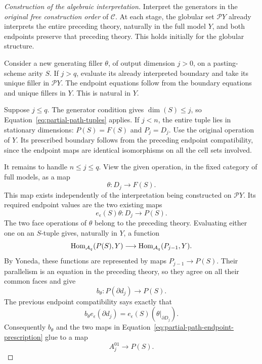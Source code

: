 \begin{proof}[Construction of the algebraic interpretation]
Interpret the generators in the \emph{original free construction order}
of \(\mathcal C\).  At each stage, the globular set
\(\mathcal P Y\) already interprets the entire preceding theory,
naturally in the full model \(Y\), and both endpoints preserve that
preceding theory.  This holds initially for the globular structure.

Consider a new generating filler \(\theta\), of output dimension
\(j>0\), on a pasting-scheme arity \(S\).  If \(j>q\),
evaluate its already interpreted boundary and take its unique filler
in \(\mathcal P Y\).  The endpoint equations follow from the
boundary equations and unique fillers in \(Y\).  This is natural
in \(Y\).

Suppose \(j\le q\).  The generator condition gives
\(\dim(S)\le j\), so Equation~\eqref{eq:partial-path-tuples}
applies.  If \(j<n\), the entire tuple lies in stationary
dimensions: \(P(S)=F(S)\) and \(P_j=D_j\).  Use the original
operation of \(Y\).  Its prescribed boundary follows from the
preceding endpoint compatibility, since the endpoint maps are identical
isomorphisms on all the cell sets involved.

It remains to handle \(n\le j\le q\).  View the given operation,
in the fixed category of full models, as a map
\[
                         \theta:D_j\longrightarrow F(S).
\]
This map exists independently of the interpretation being constructed
on \(\mathcal P Y\).  Its required endpoint values are the two
existing maps
\begin{equation}\label{eq:partial-path-endpoint-prescription}
             e_\epsilon(S)\theta:D_j\longrightarrow P(S).
\end{equation}
The two face operations of \(\theta\) belong to the preceding
theory.  Evaluating either one on an \(S\)-tuple gives, naturally
in \(Y\), a function
\[
 \operatorname{Hom}_{\mathcal A_q}(P(S),Y)
       \longrightarrow\operatorname{Hom}_{\mathcal A_q}(P_{j-1},Y).
\]
By Yoneda, these functions are represented by maps
\(P_{j-1}\to P(S)\).  Their parallelism is an equation in the
preceding theory, so they agree on all their common faces and give
\[
                 b_\theta:P(\partial d_j)\longrightarrow P(S).
\]
The previous endpoint compatibility says exactly that
\begin{equation}\label{eq:partial-path-boundary-compatibility}
 b_\theta e_\epsilon(\partial d_j)
       =e_\epsilon(S)(\theta|_{\partial D_j}).
\end{equation}
Consequently \(b_\theta\) and the two maps in
Equation~\eqref{eq:partial-path-endpoint-prescription} glue to a map
\begin{equation}\label{eq:partial-path-two-sided-prescription}
                         A_j^{01}\longrightarrow P(S).
\end{equation}


\end{proof}
